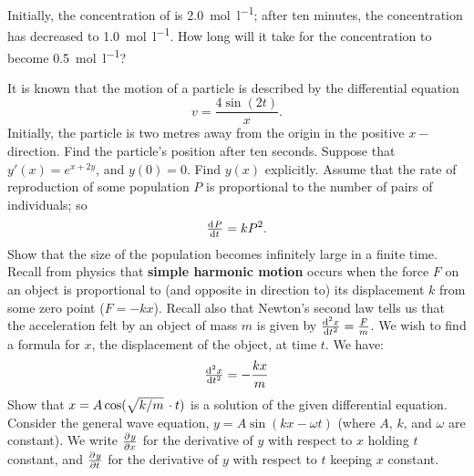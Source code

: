 \begin{questions}
\begin{parts}
            Initially, the concentration of  is \SI{2.0}{\mole\per\litre}; after ten minutes, the concentration has decreased to \SI{1.0}{\mole\per\litre}. How
            long will it take for the concentration to become \SI{0.5}{\mole\per\litre}?
    \end{parts}
  \questioM It is known that the motion of a particle is described by the differential equation
            \begin{displaymath}
              v = \frac{4\sin(2t)}{x}.
            \end{displaymath}
            Initially, the particle is two metres away from the origin in the positive $x-$direction.
            Find the particle's position after ten seconds.
  \questioM Suppose that $ y'(x) = e^{x + 2y} $, and $ y(0) = 0 $. Find $ y(x) $ explicitly.
  \questioM Assume that the rate of reproduction of some population $ P $ is proportional to the number of pairs of individuals; so
            \begin{displaymath}
              \od{P}{t} = kP^2.
            \end{displaymath}
            Show that the size of the population becomes infinitely large in a finite time.
  \questioM Recall from physics that \textbf{simple harmonic motion} occurs when the force $ F $ on an object is proportional to (and opposite
            in direction to) its displacement $ k $ from some zero point ($ F = -kx $). Recall also that Newton's second law tells us that the
            acceleration felt by an object of mass $ m $ is given by $ \od[2]{x}{t} = \frac{F}{m} $. We wish to find a formula for $ x $, the
            displacement of the object, at time $ t $. We have:
            \begin{displaymath}
              \od[2]{x}{t} = -\frac{kx}{m}
            \end{displaymath}
            Show that $ x = A \cos(\sqrt{k/m} \thinspace\cdot t) $ is a solution of the given differential equation.
  \questioS Consider the general wave equation, $ y = A\sin(kx -\omega t) $ (where $A$, $ k $, and $ \omega $ are constant). We
            write $ \pd{y}{x} $ for the derivative of $ y $ with respect to $ x $ holding $ t $ constant, and $ \pd{y}{t} $ for
            the derivative of $ y $ with respect to $ t $ keeping $ x $ constant.


\end{questions}
